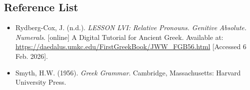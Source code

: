 \documentclass[10pt,a4paper,notitlepage]{article}
\begin{document}
    \subsection*{Reference List}
    \begin{itemize}[label={}, leftmargin=0]
        \item Rydberg-Cox, J. (n.d.). \textit{LESSON LVI: Relative Pronouns. Genitive Absolute. Numerals}. [online] A Digital Tutorial for Ancient Greek. Available at: \url{https://daedalus.umkc.edu/FirstGreekBook/JWW_FGB56.html} [Accessed 6 Feb. 2026].
        \item Smyth, H.W. (1956). \textit{Greek Grammar}. Cambridge, Massachusetts: Harvard University Press.
    \end{itemize}
\end{document}
